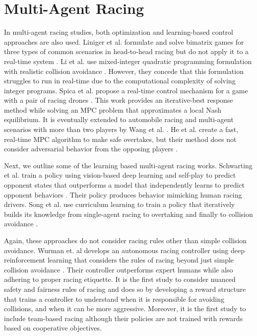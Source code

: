 \section{Multi-Agent Racing}
In multi-agent racing studies, both optimization and learning-based control approaches are also used. Liniger et al. formulate and solve bimatrix games for three types of common scenarios in head-to-head racing but do not apply it to a real-time system \cite{Liniger2020}. Li et al. use mixed-integer quadratic programming formulation with realistic collision avoidance \cite{Li2021}. However, they concede that this formulation struggles to run in real-time due to the computational complexity of solving integer programs. Spica et al. propose a real-time control mechanism for a game with a pair of racing drones \cite{spica2020real}. This work provides an iterative-best response method while solving an MPC problem that approximates a local Nash equilibrium. It is eventually extended to automobile racing and multi-agent scenarios with more than two players by Wang et al. \cite{Wang2019, Wang2021}. He et al. create a fast, real-time MPC algorithm to make safe overtakes, but their method does not consider adversarial behavior from the opposing players \cite{He2021}. 

Next, we outline some of the learning based multi-agent racing works. Schwarting et al. train a policy using vision-based deep learning and self-play to predict opponent states that outperforms a model that independently learns to predict opponent behaviors \cite{Schwarting2021}. Their policy produces behavior mimicking human racing drivers. Song et al. use curriculum learning to train a policy that iteratively builds its knowledge from single-agent racing to overtaking and finally to collision avoidance \cite{Song2021}. 

Again, these approaches do not consider racing rules other than simple collision avoidance. Wurman et. al develops an autonomous racing controller using deep reinforcement learning that considers the rules of racing beyond just simple collision avoidance \cite{sonyai}. Their controller outperforms expert humans while also adhering to proper racing etiquette. It is the first study to consider nuanced safety and fairness rules of racing and does so by developing a reward structure that trains a controller to understand when it is responsible for avoiding collisions, and when it can be more aggressive. Moreover, it is the first study to include team-based racing although their policies are not trained with rewards based on cooperative objectives. 

